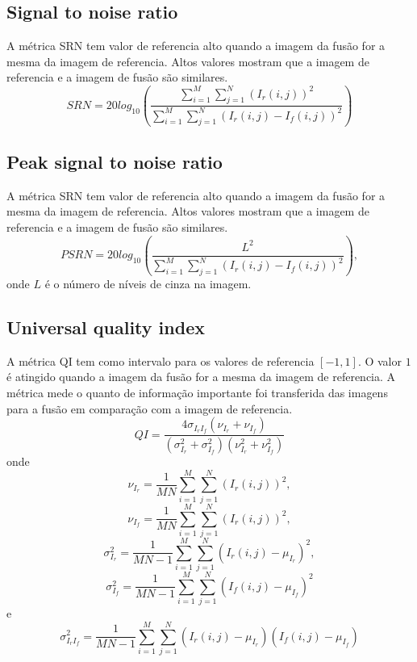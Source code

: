 \documentclass[conference]{IEEEtran}
\begin{document}
\subsection{Signal to noise ratio}
A métrica SRN tem valor de referencia alto quando a imagem da fusão for a mesma da imagem de referencia. Altos valores mostram que a imagem de referencia e a imagem de fusão são similares.
\begin{equation} 
SRN = 20log_{10}\left(\frac{\sum_{i=1}^M\sum_{j=1}^N(I_r(i,j))^2}{\sum_{i=1}^M\sum_{j=1}^N(I_r(i,j)-I_f(i,j))^2}\right)
\end{equation}
\subsection{Peak signal to noise ratio}
A métrica SRN tem valor de referencia alto quando a imagem da fusão for a mesma da imagem de referencia. Altos valores mostram que a imagem de referencia e a imagem de fusão são similares.
\begin{equation}
PSRN = 20log_{10}\left(\frac{L^2}{\sum_{i=1}^M\sum_{j=1}^N(I_r(i,j)-I_f(i,j))^2}\right),
\end{equation}
onde $L$ é o número de níveis de cinza na imagem. 

\subsection{Universal quality index}
A métrica QI tem como intervalo para os valores de referencia $[-1,1]$. O valor $1$ é atingido quando a imagem da fusão for a mesma da imagem de referencia. A métrica mede o quanto de informação importante foi transferida das imagens para a fusão em comparação com a imagem de referencia.
\begin{equation}
QI=\frac{4\sigma_{I_rI_f}(\nu_{I_r}+\nu_{I_f})}{(\sigma_{I_r}^2+\sigma_{I_f}^2)(\nu_{I_r}^2+\nu_{I_f}^2)}
\end{equation}
onde 
$$\nu_{I_r}=\frac{1}{MN}\sum_{i=1}^M\sum_{j=1}^N(I_r(i,j))^2,$$
$$\nu_{I_f}=\frac{1}{MN}\sum_{i=1}^M\sum_{j=1}^N(I_r(i,j))^2,$$ $$\sigma_{I_r}^2=\frac{1}{MN-1}\sum_{i=1}^M\sum_{j=1}^N(I_r(i,j)-\mu_{I_r})^2,$$
$$\sigma_{I_f}^2   =\frac{1}{MN-1}\sum_{i=1}^M\sum_{j=1}^N(I_f(i,j)-\mu_{I_f})^2$$ e
$$\sigma_{I_rI_f}^2=\frac{1}{MN-1}\sum_{i=1}^M\sum_{j=1}^N(I_r(i,j)-\mu_{I_r})(I_f(i,j)-\mu_{I_f})$$ 
\end{document}
